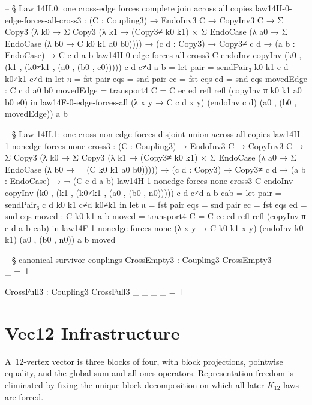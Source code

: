 \documentclass[11pt,a4paper]{book}
\def\texorpdfstring#1#2{#2}%
\begin{document}
\begin{code}
-- § Law 14H.0: one cross-edge forces complete join across all copies
law14H-0-edge-forces-all-cross3 : (C : Coupling3) → EndoInv3 C → CopyInv3 C →
  Σ Copy3 (λ k0 → Σ Copy3 (λ k1 → (Copy3≠ k0 k1) × Σ EndoCase (λ a0 → Σ EndoCase (λ b0 → C k0 k1 a0 b0)))) →
  (c d : Copy3) → Copy3≠ c d → (a b : EndoCase) → C c d a b
law14H-0-edge-forces-all-cross3 C endoInv copyInv (k0 , (k1 , (k0≠k1 , (a0 , (b0 , e0))))) c d c≠d a b =
  let
    pair = sendPair₃ k0 k1 c d k0≠k1 c≠d
  in
  let
    π = fst pair
    eqs = snd pair
    ec = fst eqs
    ed = snd eqs
    movedEdge : C c d a0 b0
    movedEdge = transport4 {C = C} ec ed refl refl (copyInv π k0 k1 a0 b0 e0)
  in
  law14F-0-edge-forces-all (λ x y → C c d x y) (endoInv c d) (a0 , (b0 , movedEdge)) a b

-- § Law 14H.1: one cross-non-edge forces disjoint union across all copies
law14H-1-nonedge-forces-none-cross3 : (C : Coupling3) → EndoInv3 C → CopyInv3 C →
  Σ Copy3 (λ k0 → Σ Copy3 (λ k1 → (Copy3≠ k0 k1) × Σ EndoCase (λ a0 → Σ EndoCase (λ b0 → ¬ (C k0 k1 a0 b0))))) →
  (c d : Copy3) → Copy3≠ c d → (a b : EndoCase) → ¬ (C c d a b)
law14H-1-nonedge-forces-none-cross3 C endoInv copyInv (k0 , (k1 , (k0≠k1 , (a0 , (b0 , n0))))) c d c≠d a b cab =
  let
    pair = sendPair₃ c d k0 k1 c≠d k0≠k1
  in
  let
    π = fst pair
    eqs = snd pair
    ec = fst eqs
    ed = snd eqs
    moved : C k0 k1 a b
    moved = transport4 {C = C} ec ed refl refl (copyInv π c d a b cab)
  in
  law14F-1-nonedge-forces-none (λ x y → C k0 k1 x y) (endoInv k0 k1) (a0 , (b0 , n0)) a b moved

-- § canonical survivor couplings
CrossEmpty3 : Coupling3
CrossEmpty3 _ _ _ _ = ⊥

CrossFull3 : Coupling3
CrossFull3 _ _ _ _ = ⊤
\end{code}

\section{Vec\texorpdfstring{$_{12}$}{12} Infrastructure}

A~12-vertex vector is three blocks of four, with block projections,
pointwise equality, and the global-sum and all-ones operators. Representation
freedom is eliminated by fixing the unique block decomposition on
which all later $K_{12}$ laws are forced.
\end{document}
